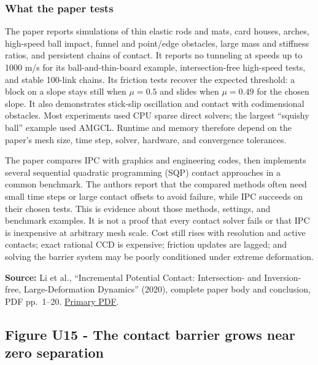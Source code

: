 \subsubsection{What the paper tests}\label{04-visual-computing-ii-ch029-what-the-paper-tests-1}

\hypertarget{04-visual-computing-ii-ch029-what-the-paper-tests-1}{}

The paper reports simulations of thin elastic rods and mats, card houses, arches, high-speed ball impact, funnel and point/edge obstacles, large mass and stiffness ratios, and persistent chains of contact. It reports no tunneling at speeds up to 1000 m/s for its ball-and-thin-board example, intersection-free high-speed tests, and stable 100-link chains. Its friction tests recover the expected threshold: a block on a slope stays still when \(\mu=0.5\) and slides when \(\mu=0.49\) for the chosen slope. It also demonstrates stick-slip oscillation and contact with codimensional obstacles. Most experiments used CPU sparse direct solvers; the largest ``squishy ball'' example used AMGCL. Runtime and memory therefore depend on the paper's mesh size, time step, solver, hardware, and convergence tolerances.

The paper compares IPC with graphics and engineering codes, then implements several sequential quadratic programming (SQP) contact approaches in a common benchmark. The authors report that the compared methods often need small time steps or large contact offsets to avoid failure, while IPC succeeds on their chosen tests. This is evidence about those methods, settings, and benchmark examples. It is not a proof that every contact solver fails or that IPC is inexpensive at arbitrary mesh scale. Cost still rises with resolution and active contacts; exact rational CCD is expensive; friction updates are lagged; and solving the barrier system may be poorly conditioned under extreme deformation.

\textbf{Source:} Li et al., ``Incremental Potential Contact: Intersection- and Inversion-free, Large-Deformation Dynamics'' (2020), complete paper body and conclusion, PDF pp.~1--20. \href{https://ipc-sim.github.io/file/IPC-paper-350ppi.pdf}{Primary PDF}.

\subsection{Figure U15 - The contact barrier grows near zero separation}\label{04-visual-computing-ii-ch029-figure-u15---the-contact-barrier-grows-near-zero-separation}

